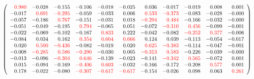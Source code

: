 \documentclass[]{article}
\begin{document}
\[
\left(
\begin{array}{rrrrrrrrrrr}
\color{red} 0.980 & -0.028 & -0.155 & -0.106 & -0.018 & -0.025 & 0.036 & -0.017 & -0.019 & 0.008 & 0.001 \\
-0.017 & \color{red} 0.691 & \color{red} -0.295 & -0.059 & -0.033 & 0.006 & \color{red} 0.533 & \color{red} -0.373 & -0.083 & -0.028 & -0.000 \\
-0.057 & -0.186 & \color{red} 0.767 & -0.151 & -0.031 & 0.018 & \color{red} -0.294 & \color{red} 0.484 & -0.166 & -0.032 & -0.000 \\
-0.051 & -0.049 & -0.195 & \color{red} 0.794 & -0.065 & 0.051 & -0.072 & \color{red} -0.310 & \color{red} 0.456 & -0.099 & -0.001 \\
-0.022 & -0.069 & -0.102 & -0.167 & \color{red} 0.833 & 0.222 & -0.042 & -0.082 & \color{red} -0.252 & \color{red} 0.377 & -0.006 \\
-0.084 & 0.034 & 0.162 & \color{red} 0.354 & \color{red} 0.604 & \color{red} 0.666 & 0.124 & 0.039 & -0.113 & -0.054 & -0.017 \\
0.020 & \color{red} 0.500 & \color{red} -0.436 & -0.082 & -0.019 & 0.020 & \color{red} 0.625 & \color{red} -0.383 & -0.114 & -0.047 & -0.001 \\
-0.008 & \color{red} -0.285 & \color{red} 0.586 & \color{red} -0.290 & -0.030 & 0.005 & \color{red} -0.313 & \color{red} 0.583 & -0.226 & -0.039 & -0.000 \\
-0.013 & -0.096 & \color{red} -0.304 & \color{red} 0.646 & -0.139 & -0.023 & -0.141 & \color{red} -0.342 & \color{red} 0.565 & -0.072 & 0.001 \\
0.015 & -0.094 & -0.169 & \color{red} -0.406 & \color{red} 0.603 & -0.032 & -0.166 & -0.172 & -0.208 & \color{red} 0.577 & 0.001 \\
0.178 & -0.022 & -0.080 & \color{red} -0.307 & \color{red} -0.617 & \color{red} -0.617 & -0.154 & -0.026 & 0.098 & 0.063 & \color{red} 0.261 \\
\end{array}
\right)
\]
\end{document}
